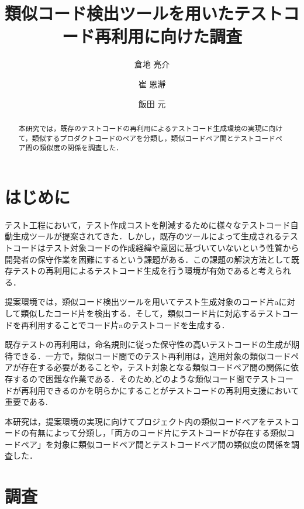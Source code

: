 \documentclass{fose2019}           %
\title{類似コード検出ツールを用いたテストコード再利用に向けた調査}
\author{倉地 亮介}{Ryosuke Kurachi, 奈良先端科学技術大学院大学}
\author{崔 恩瀞}{Eunjong Choi, 京都工芸繊維大学}
\author{飯田 元}{Hajimu Iida, 奈良先端科学技術大学院大学}
\begin{document}
\maketitle


\begin{abstract}
本研究では，既存のテストコードの再利用によるテストコード生成環境の実現に向けて，類似するプロダクトコードのペアを分類し，類似コードペア間とテストコードペア間の類似度の関係を調査した．
\end{abstract}

\section{はじめに}
テスト工程において，テスト作成コストを削減するために様々なテストコード自動生成ツールが提案されてきた．しかし，既存のツールによって生成されるテストコードはテスト対象コードの作成経緯や意図に基づいていないという性質から開発者の保守作業を困難にするという課題がある\cite{ICST}．この課題の解決方法として既存テストの再利用によるテストコード生成を行う環境が有効であると考えられる．

\indent 提案環境では，類似コード検出ツールを用いてテスト生成対象のコード片aに対して類似したコード片を検出する．そして，類似コード片に対応するテストコードを再利用することでコード片aのテストコードを生成する．

\indent 既存テストの再利用は，命名規則に従った保守性の高いテストコードの生成が期待できる．一方で，類似コード間でのテスト再利用は，適用対象の類似コードペアが存在する必要があることや，テスト対象となる類似コードペア間の関係に依存するので困難な作業である．そのため,どのような類似コード間でテストコードが再利用できるのかを明らかにすることがテストコードの再利用支援において重要である.

\indent 本研究は，提案環境の実現に向けてプロジェクト内の類似コードペアをテストコードの有無によって分類し，「両方のコード片にテストコードが存在する類似コードペア」を対象に類似コードペア間とテストコードペア間の類似度の関係を調査した．

\section{調査}
\end{document}
